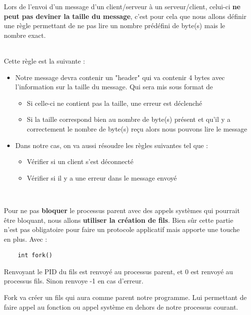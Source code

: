 \par 
Lors de l'envoi d'un message d'un client/serveur à un serveur/client, celui-ci \textbf{ne peut pas deviner la taille du message}, c'est pour cela que nous allons définir une règle permettant de ne pas lire un nombre prédéfini de byte(s) mais le nombre exact. \\ \\ \par
Cette règle est la suivante :
\begin{itemize}
\item Notre message devra contenir un "header" qui va contenir 4 bytes avec l'information sur la taille du message. Qui sera mis sous format de 
\begin{itemize}
\item Si celle-ci ne contient pas la taille, une erreur est déclenché
\item Si la taille correspond bien au nombre de byte(s) présent et qu'il y a correctement le nombre de byte(s) reçu alors nous pouvons lire le message
\end{itemize}
\item Dans notre cas, on va aussi résoudre les règles suivantes tel que :
\begin{itemize}
\item Vérifier si un client s'est déconnecté
\item Vérifier si il y a une erreur dans le message envoyé
\end{itemize}
\end{itemize}

\hfill \\ \par Pour ne pas \textbf{bloquer} le processus parent avec des appels systèmes qui pourrait être bloquant, nous allons \textbf{utiliser la création de fils}. 
Bien sûr cette partie n'est pas obligatoire pour faire un protocole applicatif mais apporte une touche en plus. Avec : \begin{lstlisting}
    int fork()
\end{lstlisting}

Renvoyant le PID du fils est renvoyé au processus parent, et 0 est renvoyé au processus fils. Sinon renvoye -1 en cas d'erreur.

Fork va créer un fils qui aura comme parent notre programme. Lui permettant de faire appel au fonction ou appel système en dehors de notre processus courant.




